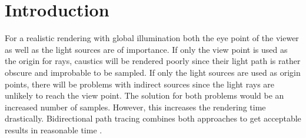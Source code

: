 \section{Introduction}
For a realistic rendering with global illumination both the eye point of the viewer as well as the light sources are of importance. If only the view point is used as the origin for rays, caustics will be rendered poorly since their light path is rather obscure and improbable to be sampled. If only the light sources are used as origin points, there will be problems with indirect sources since the light rays are unlikely to reach the view point. The solution for both problems would be an increased number of samples. However, this increases the rendering time drastically. Bidirectional path tracing combines both approaches to get acceptable results in reasonable time \cite{lafortune1993bi}.